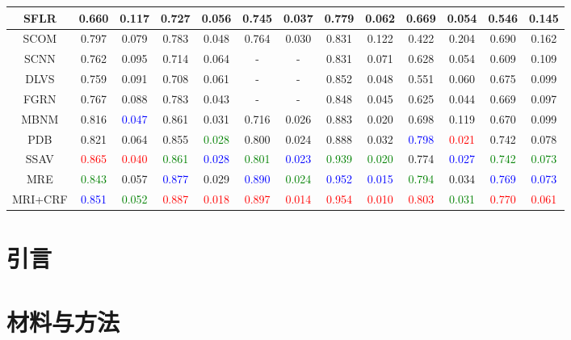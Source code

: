 \begin{table}[]
\begin{tabular}{|c|c|c|c|c|c|c|c|c|c|c|c|c|}
SFLR & 0.660 & 0.117 & 0.727 & 0.056 & 0.745 & 0.037 & 0.779 & 0.062 & 0.669 & 0.054 & 0.546 & 0.145 \\ \hline
SCOM & 0.797 & 0.079 & 0.783 & 0.048 & 0.764 & 0.030 & 0.831 & 0.122 & 0.422 & 0.204 & 0.690 & 0.162 \\ \hline
SCNN & 0.762 & 0.095 & 0.714 & 0.064 & - & - & 0.831 & 0.071 & 0.628 & 0.054 & 0.609 & 0.109 \\ \hline
DLVS & 0.759 & 0.091 & 0.708 & 0.061 & - & - & 0.852 & 0.048 & 0.551 & 0.060 & 0.675 & 0.099 \\ \hline
FGRN & 0.767 & 0.088 & 0.783 & 0.043 & - & - & 0.848 & 0.045 & 0.625 & 0.044 & 0.669 & 0.097 \\ \hline
MBNM & 0.816 & \textcolor{blue}{0.047} & 0.861 & 0.031 & 0.716 & 0.026 & 0.883 & 0.020 & 0.698 & 0.119 & 0.670 & 0.099 \\ \hline
PDB & 0.821 & 0.064 & 0.855 & \textcolor{green}{0.028} & 0.800 & 0.024 & 0.888 & 0.032 & \textcolor{blue}{0.798} & \textcolor{red}{0.021} & 0.742 & 0.078 \\ \hline
SSAV & \textcolor{red}{0.865} & \textcolor{red}{0.040} & \textcolor{green}{0.861} & \textcolor{blue}{0.028} & \textcolor{green}{0.801} & \textcolor{blue}{0.023} & \textcolor{green}{0.939} & \textcolor{green}{0.020} & 0.774 & \textcolor{blue}{0.027} & \textcolor{green}{0.742} & \textcolor{green}{0.073} \\ \hline \hline
MRE & \textcolor{green}{0.843} & 0.057 & \textcolor{blue}{0.877} & 0.029 & \textcolor{blue}{0.890} & \textcolor{green}{0.024} & \textcolor{blue}{0.952} & \textcolor{blue}{0.015} & \textcolor{green}{0.794} & 0.034 & \textcolor{blue}{0.769} & \textcolor{blue}{0.073} \\ \hline
MRI+CRF & \textcolor{blue}{0.851} & \textcolor{green}{0.052} & \textcolor{red}{0.887} & \textcolor{red}{0.018} & \textcolor{red}{0.897} & \textcolor{red}{0.014} & \textcolor{red}{0.954} & \textcolor{red}{0.010} & \textcolor{red}{0.803} & \textcolor{green}{0.031} & \textcolor{red}{0.770} & \textcolor{red}{0.061} \\ \hline
\end{tabular}
\end{table}
\section{引言}
\blindtext

\section{材料与方法}
